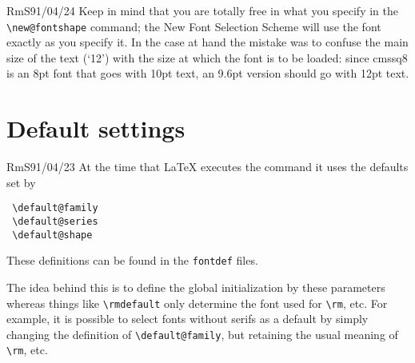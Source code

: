 \begin{comment}{BK}{91/04/22}
 When using an 8pt-font (e.g.\  with design size 8pt) like cmssq8
 in size 10pt, you cannot write
 \begin{verbatim}
 \new@fontshape{cmssq}{m}{n}{%
 ...
 <10> cmssq8%
 <11> cmssq8 at 10.95pt%
 <12> cmssq8 at 12pt%
 ...
 \end{verbatim}
 If you do so the font will in size 12pt (e.g.\ with \verb'\large')
 be scaled with magnification 1500 rather than 1200.

 Solution: write
 \begin{verbatim}
 ...
 <12> cmssq8 at9.6pt%
 ...
 \end{verbatim}
 or
 \begin{verbatim}
 ...
 <12> cmssq8 scaled 1200%
 ...
 \end{verbatim}
 instead.
\end{comment}
\begin{remark}{RmS}{91/04/24}
 Keep in mind that you are totally free in what you specify in the
 \verb'\new@fontshape' command; the New Font Selection Scheme will
 use the font exactly as you specify it. In the case at hand the mistake
 was to confuse the main size of the text (`12') with the size at which
 the font is to be loaded: since cmssq8 is an 8pt font that goes with
 10pt text, an 9.6pt version should go with 12pt text.
\end{remark}

\section{Default settings}

\begin{comment}{EM}{91/04/23}
 I just tried to make a \LaTeX{} format file for the use of
 PostScript Fonts. These should be used via DVIPS and the font
 definitions should be done via the New Font Selection Scheme.

 In principle this works very well, but I cannot manage the scheme
 to use times-roman rather than cmr10 right from the beginning.
 \verb'\rmdefault' is set correctly, and everything works well if
 one starts the document with \verb'\rm'. But it is not possible to
 write \verb'\rm' during the Ini\TeX{} run since a lot of things are
 not yet defined.
\end{comment}

\begin{remark}{RmS}{91/04/23}
 At the time that \LaTeX{} executes the \verb'' command
 it uses the defaults set by
 \begin{verbatim}
 \default@family
 \default@series
 \default@shape
 \end{verbatim}
 These definitions can be found in the {\tt fontdef} files.

 The idea behind this is to define the global initialization by these
 parameters whereas things like \verb'\rmdefault' only determine the font
 used for \verb'\rm', etc.
 For example, it is possible to select fonts without serifs as a default by
 simply changing the definition of \verb'\default@family', but
 retaining the usual meaning of \verb'\rm', etc.
\end{remark}

